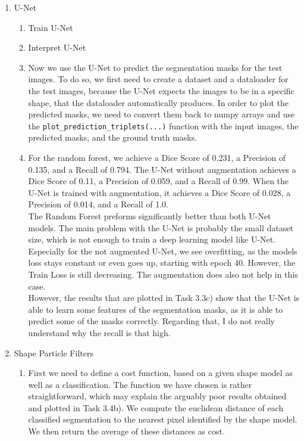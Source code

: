 \documentclass[
    a4paper,
    12pt,
    parskip=half,
]{scrarticle}
\begin{document}
\begin{enumerate}
\begin{enumerate}[label=\theenumi.\arabic*.]
        \item U-Net
        \begin{enumerate}[label=\alph*)]
            \item Train U-Net
            \item Interpret U-Net
            \item Now we use the U-Net to predict the segmentation masks for the test images.
            To do so, we first need to create a dataset and a dataloader for the test images, because the U-Net expects the images to be in a specific shape, that the dataloader automatically produces.
            In order to plot the predicted masks, we need to convert them back to numpy arrays and use the \texttt{plot\_prediction\_triplets(...)} function with the input images, the predicted masks, and the ground truth masks.
            \item For the random forest, we achieve a Dice Score of 0.231, a Precision of 0.135, and a Recall of 0.794.
            The U-Net without augmentation achieves a Dice Score of 0.11, a Precision of 0.059, and a Recall of 0.99.
            When the U-Net is trained with augmentation, it achieves a Dice Score of 0.028, a Precision of 0.014, and a Recall of 1.0.
            \\
            The Random Forest preforms significantly better than both U-Net models.
            The main problem with the U-Net is probably the small dataset size, which is not enough to train a deep learning model like U-Net.
            Especially for the not augmented U-Net, we see overfitting, as the models loss stays constant or even goes up, starting with epoch 40.
            However, the Train Loss is still decreasing.
            The augmentation does also not help in this case.
            \\
            However, the results that are plotted in Task 3.3c) show that the U-Net is able to learn some features of the segmentation masks, as it is able to predict some of the masks correctly.
            Regarding that, I do not really understand why the recall is that high.
        \end{enumerate}
        \item Shape Particle Filters
        \begin{enumerate}[label=\alph*)]
            \item First we need to define a cost function, based on a given shape model as well as a classification. The function we have chosen is rather straightforward, which may explain the arguably poor results obtained and plotted in Task 3.4b). We compute the euclidean distance of each classified segmentation to the nearest pixel identified by the shape model. We then return the average of these distances as cost.\\

\end{enumerate}
\end{enumerate}
\end{enumerate}
\end{document}

